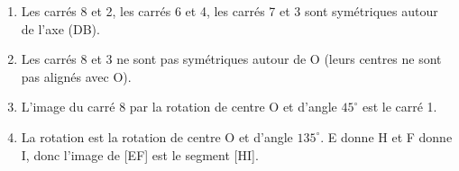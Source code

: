 	
%		
%		
%		
%		
%		
%		
%		
%		
%		
\medskip

	\begin{enumerate}
		\item %
Les carrés 8 et 2,  les carrés 6 et 4, les carrés 7 et 3 sont symétriques autour de l'axe (DB).	
		\item %
Les carrés 8 et 3 ne sont pas symétriques autour de O (leurs centres ne sont pas alignés avec O).		
		\item %
		
L'image du carré 8 par la rotation de centre O et d'angle $45^{\circ}$ est le carré 1.
		
		\item %
		
La rotation est la rotation de centre O et d'angle $135^{\circ}$. E donne H et F donne I, donc l'image de [EF] est le segment [HI].
	\end{enumerate}

\bigskip

